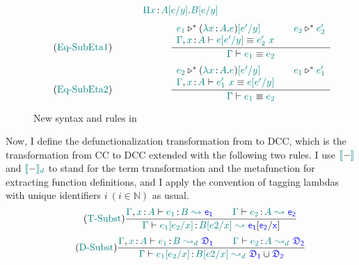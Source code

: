 \begin{figure}
\begin{align*}
		\color{teal}{\Pi x}\color{black} \hspace{0.5mm}{:}\hspace{0.5mm} \color{teal}{A[e\slash y]}\color{black}. \color{teal}{B[e\slash y]}\color{black}
	\end{align*}
	\begin{equation}
		\tag{\helper{Eq-SubEta1}}
		\qquad\qquad\qquad
		\frac
			{\begin{array}{l @{\qquad} l}
			\helper{e_1} \triangleright^* (\helper{\lambda x} \goodcolon \helper{A} . \helper{e})\helper{\sub{e'}{y}} &
			 \helper{e_2} \triangleright^* \helper{e_2'}\\
			 \helper{\Gamma}, \helper{x} \goodcolon \helper{A} \vdash \helper{e\sub{e'}{y}} \equiv \helper{e_2'}\ \helper{x}
			 \end{array}
			 }
			{\helper{\Gamma} \vdash \helper{e_1} \equiv \helper{e_2}}
	\end{equation}
	\begin{equation}
		\tag{\helper{Eq-SubEta2}}
		\qquad\qquad\qquad
		\frac
			{\begin{array}{l @{\qquad} l}
			 \helper{e_2} \triangleright^* (\helper{\lambda x} \goodcolon \helper{A} . \helper{e})\helper{\sub{e'}{y}} &
			 \helper{e_1} \triangleright^* \helper{e_1'} \\
			 \helper{\Gamma}, \helper{x} \goodcolon \helper{A} \vdash \helper{e_1'}\ \helper{x} \equiv \helper{e\sub{e'}{y}}
			 \end{array}
			 }
			{\helper{\Gamma} \vdash \helper{e_1} \equiv \helper{e_2}}
	\end{equation}
\label{fig: ccs}
\caption{New syntax and rules in {\ccs}}
\end{figure}

Now, I define the defunctionalization transformation from {\ccs} to DCC, which is the transformation from CC to DCC extended with the following two rules. I use $\color{teal}{[\![}\color{black}{-}\color{teal}{]\!]}\color{black}$ and $\color{teal}{[\![}\color{black}{-}\color{teal}{]\!]_d}\color{black}$ to stand for the term transformation and the metafunction for extracting function definitions, and I apply the convention of tagging lambdas with unique identifiers $i\ (i \in \mathbb{N})$ as usual.
\begin{equation}
	\tag{\helper{T-Subst}}
	\frac
		{\helper{\Gamma}, \helper{x} \goodcolon \helper{A} \vdash \helper{e_1} \goodcolon \helper{B} \ \helper{\leadsto}\ 
		 \target{e_1} \qquad
		 \helper{\Gamma} \vdash \helper{e_2} \goodcolon \helper{A}\ \helper{\leadsto}\ \target{e_2}
		}
		{
		 \helper{\Gamma} \vdash \helper{e_1\sub{e_2}{x}} \goodcolon \helper{B\sub{e2}{x}}\ \helper{\leadsto}\
		 \target{e_1}\targetsub{e_2}{x}
		}
\end{equation}
\begin{equation}
	\tag{\helper{D-Subst}}
	\frac
		{\helper{\Gamma}, \helper{x} \goodcolon \helper{A} \vdash \helper{e_1} \goodcolon \helper{B} \ \helper{\leadsto_d}\ 
		 \target{\fdef_1} \qquad
		 \helper{\Gamma} \vdash \helper{e_2} \goodcolon \helper{A}\ \helper{\leadsto_d}\ \target{\fdef_2}
		}
		{
		 \helper{\Gamma} \vdash \helper{e_1\sub{e_2}{x}} \goodcolon \helper{B\sub{e2}{x}}\ \helper{\leadsto_d}\
		 \target{\fdef_{1}} \cup \target{\fdef_2}
		}
\end{equation}

